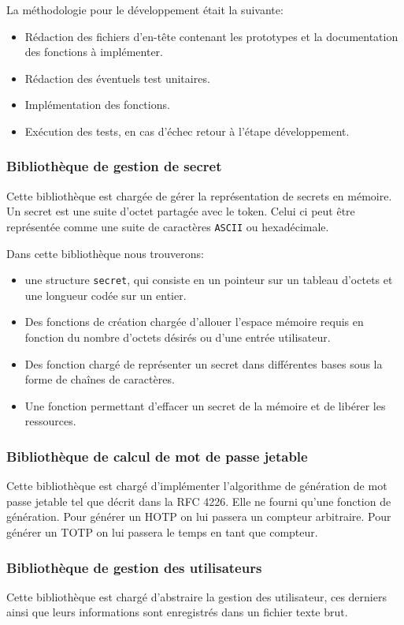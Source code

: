 La méthodologie pour le développement était la suivante:
\begin{itemize}
  \item Rédaction des fichiers d'en-tête contenant les prototypes et la 
  documentation des fonctions à implémenter. 
  \item Rédaction des éventuels test unitaires.
  \item Implémentation des fonctions.
  \item Exécution des tests, en cas d'échec retour à l'étape développement.
\end{itemize}

\subsubsection{Bibliothèque de gestion de secret}
Cette bibliothèque est chargée de gérer la représentation de secrets en mémoire.
Un secret est une suite d'octet partagée avec le token. Celui ci peut être 
représentée comme une suite de caractères \verb?ASCII? ou hexadécimale.

Dans cette bibliothèque nous trouverons:
\begin{itemize}
  \item une structure \verb?secret?, qui consiste en un pointeur sur un tableau 
  d'octets et une longueur codée sur un entier.
  \item Des fonctions de création chargée d'allouer l'espace mémoire requis en
  fonction du nombre d'octets désirés ou d'une entrée utilisateur.
  \item Des fonction chargé de représenter un secret dans différentes bases
  sous la forme de chaînes de caractères.
  \item Une fonction permettant d'effacer un secret de la mémoire et de 
  libérer les ressources.
\end{itemize}

\subsubsection{Bibliothèque de calcul de mot de passe jetable}
Cette bibliothèque est chargé d'implémenter l'algorithme de génération de mot
passe jetable tel que décrit dans la RFC 4226\cite{HOTPrfc}. Elle ne fourni
qu'une fonction de génération. Pour générer un HOTP on lui passera un compteur
arbitraire. Pour générer un TOTP on lui passera le temps en tant que compteur.

\subsubsection{Bibliothèque de gestion des utilisateurs}
Cette bibliothèque est chargé d'abstraire la gestion des utilisateur, ces
derniers ainsi que leurs informations sont enregistrés dans un fichier texte
brut.

